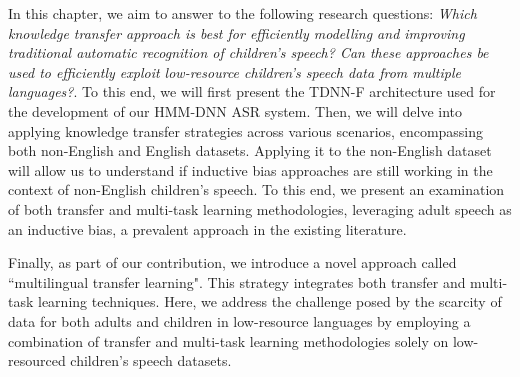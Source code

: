In this chapter, we aim to answer to the following research questions: \textit{Which knowledge transfer approach is best for efficiently modelling and improving traditional automatic recognition of children's speech? Can these approaches be used to efficiently exploit low-resource children's speech data from multiple languages?}. To this end, we will first present the \ac{TDNN-F} architecture used for the development of our \ac{HMM-DNN} \ac{ASR} system. Then, we will delve into applying knowledge transfer strategies across various scenarios, encompassing both non-English and English datasets. Applying it to the non-English dataset will allow us to understand if inductive bias approaches are still working in the context of non-English children's speech. To this end, we present an examination of both transfer and multi-task learning methodologies, leveraging adult speech as an inductive bias, a prevalent approach in the existing literature. 

Finally, as part of our contribution, we introduce a novel approach called ``multilingual transfer learning". This strategy integrates both transfer and multi-task learning techniques. Here, we address the challenge posed by the scarcity of data for both adults and children in low-resource languages by employing a combination of transfer and multi-task learning methodologies solely on low-resourced children's speech datasets.

